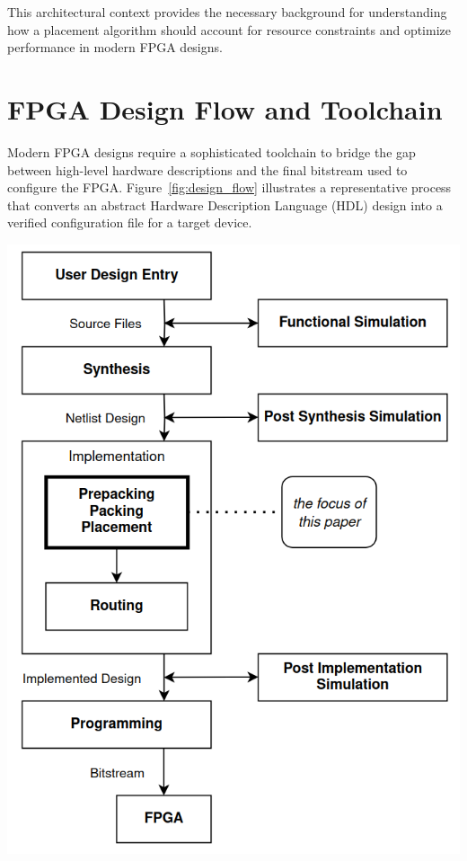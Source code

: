 \documentclass{article}
\begin{document}
\begin{multicols}{2}
    This architectural context provides the necessary background for understanding how a placement algorithm should account for resource constraints and optimize performance in modern FPGA designs.


\newpage
\section{FPGA Design Flow and Toolchain}
    \label{sec:fpga_flow_toolchain}

    Modern FPGA designs require a sophisticated toolchain to bridge the gap between high-level hardware descriptions and the final bitstream used to configure the FPGA. 
    Figure~\ref{fig:design_flow} illustrates a representative process that converts an abstract Hardware Description Language (HDL) design into a verified configuration file for a target device.

    {
        \centering
        \includegraphics[width=0.9\columnwidth]{figures/design_flow.png}
        \label{fig:design_flow}
    }


\end{multicols}
\end{document}
